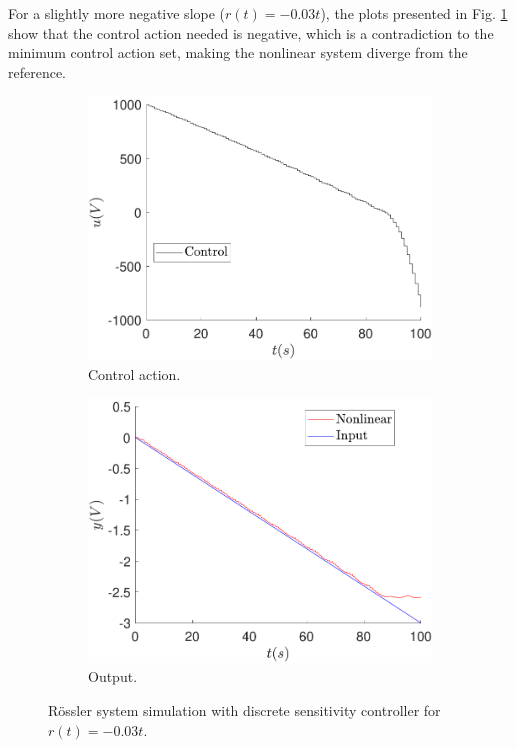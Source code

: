 	For a slightly more negative slope ($r(t)=-0.03t$), the plots presented in Fig. \ref{fig:sens_ref_-0_03t} show that the control action needed is negative, which is a contradiction to the minimum control action set, making the nonlinear system diverge from the reference.
	
	\begin{figure}
        \centering
        \begin{subfigure}[b]{0.475\textwidth}
            \centering
            \includegraphics[scale=0.425]{files/heuristic/Sensitivity/control_sens_ramp_ref_-0_03.pdf}
            \caption{Control action.}
        \end{subfigure}
        \vskip0.1cm
        \begin{subfigure}[b]{0.475\textwidth}   
            \centering
            \includegraphics[scale=0.425]{files/heuristic/Sensitivity/sens_ramp_ref_-0_03.pdf}
            \caption{Output.}
        \end{subfigure}
        \caption{Rössler system simulation with discrete sensitivity controller for $r(t)=-0.03t$.}
        \label{fig:sens_ref_-0_03t}
	\end{figure}
	
